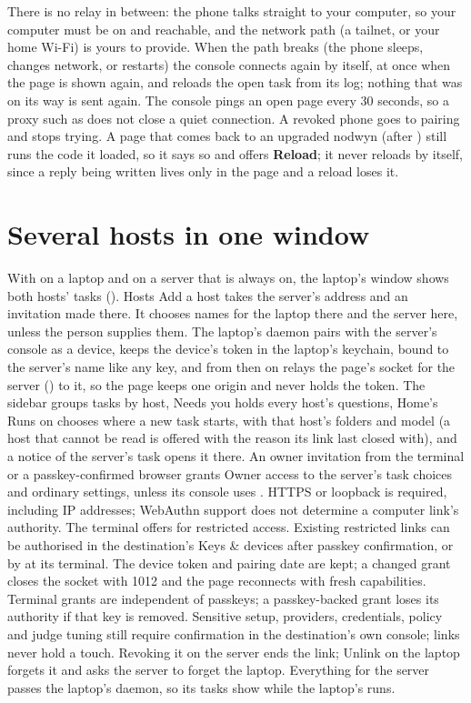 There is no relay in between: the phone talks straight to your computer, so
your computer must be on and reachable, and the network path (a tailnet, or
your home Wi-Fi) is yours to provide. When the path breaks (the phone
sleeps, changes network, or  restarts) the console connects
again by itself, at once when the page is shown again, and reloads the open
task from its log; nothing that was on its way is sent again. The console
pings an open page every 30 seconds, so a proxy such as  does not close a quiet connection. A revoked phone goes to pairing
and stops trying. A page that comes back to an upgraded nodwyn (after
) still runs the code it loaded, so it says so and
offers \textbf{Reload}; it never reloads by itself, since a reply being
written lives only in the page and a reload loses it.

\section{Several hosts in one window}

With \nodwyn{} on a laptop and on a server that is always on, the laptop's
window shows both hosts' tasks (). Hosts \textrightarrow{} Add a host
takes the server's address and an invitation made there. It chooses names
for the laptop there and the server here, unless the person supplies them.
The laptop's daemon pairs with
the server's console as a device, keeps the device's token in the laptop's
keychain, bound to the server's name like any key, and from then on relays
the page's socket for the server () to it, so the
page keeps one origin and never holds the token. The sidebar groups tasks
by host, Needs you holds every host's questions, Home's Runs on chooses
where a new task starts, with that host's folders and model (a host that
cannot be read is offered with the reason its link last closed with), and a notice
of the server's task opens it there. An owner invitation from the terminal or a passkey-confirmed browser grants
Owner access to the server's task choices and ordinary settings, unless its
console uses . HTTPS or loopback is required, including
IP addresses; WebAuthn support does not determine a computer link's authority.
The terminal offers  for restricted
access. Existing restricted links can be authorised in the destination's
Keys \& devices after passkey confirmation, or by
 at its terminal. The device token and
pairing date are kept; a changed grant closes the socket with 1012 and the
page reconnects with fresh capabilities. Terminal grants are independent of
passkeys; a passkey-backed grant loses its authority if that key is removed.
Sensitive setup, providers, credentials, policy and judge tuning still require
confirmation in the destination's own console; links never hold a touch.
Revoking it on the server ends the link; Unlink on the laptop forgets it
and asks the server to forget the laptop. Everything for the server passes
the laptop's daemon, so its tasks show while the laptop's \nodwyn{} runs.

